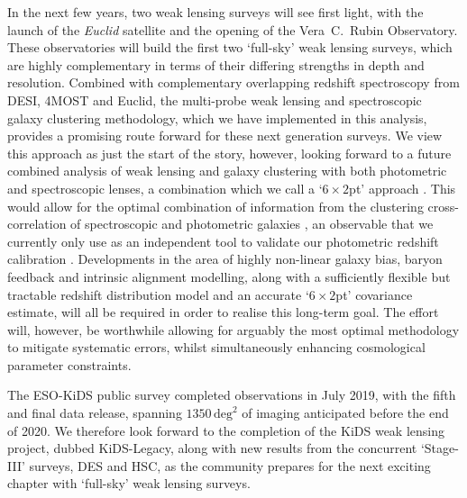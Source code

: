 In the next few years, two weak lensing surveys will see first light, with the launch of the {\it Euclid} satellite and the opening of the Vera~C.~Rubin Observatory.   These observatories will build the first two `full-sky' weak lensing surveys, which are highly complementary in terms of their differing strengths in depth and resolution.  Combined with complementary overlapping redshift spectroscopy from DESI, 4MOST and Euclid, the multi-probe weak lensing and spectroscopic galaxy clustering methodology, which we have implemented in this analysis, provides a promising route forward for these next generation surveys.   We view this \tttp approach as just the start of the story, however, looking forward to a future combined analysis of weak lensing and galaxy clustering with both photometric and spectroscopic lenses, a combination which we call a `$6\times2$pt' approach \citep{bernstein:2009}.    This would allow for the optimal combination of information from the clustering cross-correlation of spectroscopic and photometric galaxies \citep{newman:2008}, an observable that we currently only use as an independent tool to validate our photometric redshift calibration \citep{hildebrandt/etal:inprep}.      Developments in the area of highly non-linear galaxy bias, baryon feedback and intrinsic alignment modelling, along with a sufficiently flexible but tractable redshift distribution model and an accurate `$6\times2$pt' covariance estimate, will all be required in order to realise this long-term goal.   The effort will, however, be worthwhile allowing for arguably the most optimal methodology to mitigate systematic errors, whilst simultaneously enhancing cosmological parameter constraints.

The ESO-KiDS public survey completed observations in July 2019, with the fifth and final data release, spanning $1350\,\mathrm{deg}^{2}$ of imaging anticipated before the end of 2020.  We therefore look forward to the completion of the KiDS weak lensing project, dubbed KiDS-Legacy, along with new results from the concurrent `Stage-III' surveys, DES and HSC, as the community prepares for the next exciting chapter with `full-sky' weak lensing surveys.  
